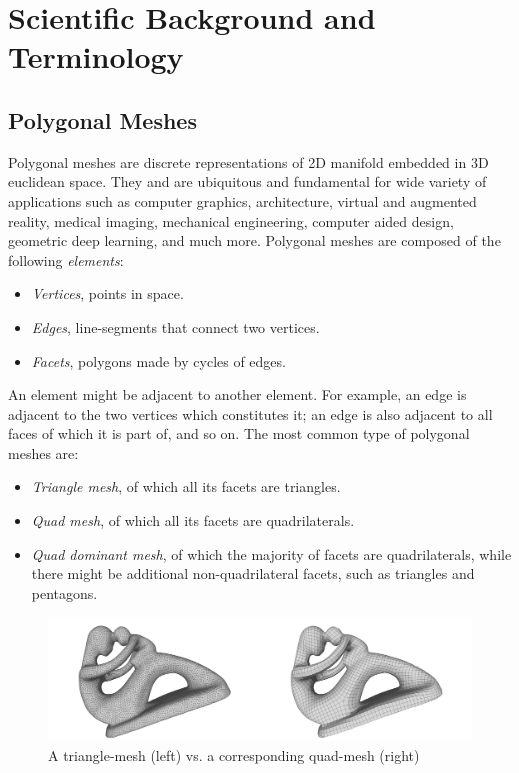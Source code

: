 \chapter{Scientific Background and Terminology}

\section{Polygonal Meshes}

Polygonal meshes are discrete representations of 2D manifold embedded in 3D euclidean space. They and are ubiquitous and fundamental for wide variety of applications such as computer graphics, architecture, virtual and augmented reality, medical imaging, mechanical engineering, computer aided design, geometric deep learning, and much more. Polygonal meshes are composed of the following \emph{elements}:

\begin{itemize}
    \item \emph{Vertices}, points in space.
    \item \emph{Edges}, line-segments that connect two vertices.
    \item \emph{Facets}, polygons made by cycles of edges.
\end{itemize}

\noindent An element might be adjacent to another element. For example, an edge is adjacent to the two vertices which constitutes it; an edge is also adjacent to all faces of which it is part of, and so on. The most common type of polygonal meshes are:

\begin{itemize}
    \item \emph{Triangle mesh}, of which all its facets are triangles.
    \item \emph{Quad mesh}, of which all its facets are quadrilaterals.
    \item \emph{Quad dominant mesh}, of which the majority of facets are quadrilaterals, while there might be additional non-quadrilateral facets, such as triangles and pentagons.
\end{itemize}

\begin{figure}[ht]
\centering
\includegraphics[width=15cm]{figures/tri_mesh_vs_quad_mesh.png}
\caption[Triangular mesh vs. Quad mesh]{A triangle-mesh (left) vs. a corresponding quad-mesh (right)}
\label{fig:tri_mesh_vs_quad_mesh}
\end{figure}


